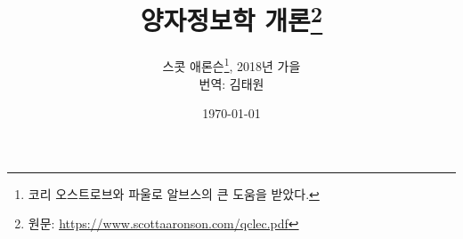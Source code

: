 \documentclass[a4paper,chapter,kosection,atbegshi]{oblivoir}
\begin{document}
\title{양자정보학 개론\thanks{원문: \url{https://www.scottaaronson.com/qclec.pdf}}}
\author{
    스콧 애론슨\thanks{코리 오스트로브와 파울로 알브스의 큰 도움을 받았다.}, 
    2018년 가을\\
    번역: 김태원
}
\date{\today}
\newpage
\maketitle\thispagestyle{empty}\newpage

\tableofcontents
\end{document}
